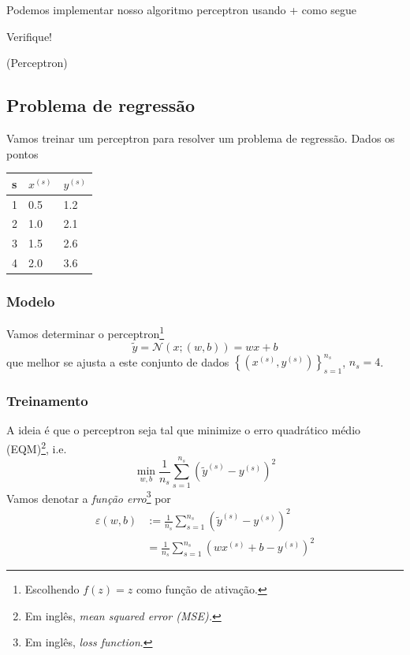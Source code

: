 \ifispython
Podemos implementar nosso algoritmo perceptron usando {\python}+{\pytorch} como segue



Verifique!
\fi

\begin{teo}(Perceptron)
  \emconstrucao
\end{teo}

\subsection{Problema de regressão}

Vamos treinar um perceptron para resolver um problema de regressão. Dados os pontos
\begin{center}
  \begin{tabular}{l|ll}
    s & $x^{(s)}$ & $y^{(s)}$\\\hline
    1 & 0.5 & 1.2\\
    2 & 1.0 & 2.1\\
    3 & 1.5 & 2.6\\
    4 & 2.0 & 3.6\\\hline
  \end{tabular}
\end{center}

\subsubsection{Modelo}

Vamos determinar o perceptron\footnote{Escolhendo $f(z)=z$ como função de ativação.}
\begin{equation}\label{eq:percep_regr}
  \tilde{y} = \mathcal{N}(x; (w, b)) = wx + b
\end{equation}
que melhor se ajusta a este conjunto de dados $\left\{(x^{(s)}, y^{(s)})\right\}_{s=1}^{n_s}$, $n_s=4$.

\subsubsection{Treinamento}

A ideia é que o perceptron seja tal que minimize o erro quadrático médio (EQM)\footnote{Em inglês, \it{mean squared error} (MSE).}, i.e.
\begin{equation}\label{eq_percep:regr_prob}
  \min_{w,b}\frac{1}{n_s}\sum_{s=1}^{n_s}\left(\tilde{y}^{(s)}-y^{(s)}\right)^2
\end{equation}
Vamos denotar a \emph{função erro}\footnote{Em inglês, {\it loss function}.} por
\begin{align}\label{eq:eqm}
  \varepsilon(w,b) &:= \frac{1}{n_s}\sum_{s=1}^{n_s}\left(\tilde{y}^{(s)}-y^{(s)}\right)^2\\
                   &= \frac{1}{n_s}\sum_{s=1}^{n_s}\left(wx^{(s)}+b-y^{(s)}\right)^2
\end{align}


